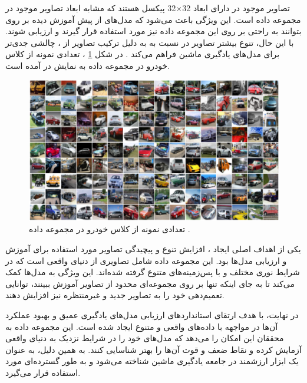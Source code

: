 تصاویر موجود در
دارای ابعاد
32$\times$32
پیکسل هستند که مشابه ابعاد تصاویر موجود در مجموعه داده
است. این ویژگی باعث می‌شود که مدل‌های از پیش آموزش دیده بر روی
بتوانند به راحتی بر روی این مجموعه داده نیز مورد استفاده قرار گیرند و ارزیابی شوند. با این حال، تنوع بیشتر تصاویر در
نسبت به
به دلیل ترکیب تصاویر از
،
چالشی جدی‌تر برای مدل‌های یادگیری ماشین فراهم می‌کند
\cite{darlow2018cinic}.
در شکل
\ref{cinic10}%
، تعدادی نمونه از کلاس خودرو در مجموعه داده
\mbox{}
به نمایش در آمده است.


\begin{figure}[t]
	\centering
	\includegraphics[scale=0.5]{images/chap5/cinic10.png}%
	\caption{%
		تعدادی نمونه از کلاس خودرو در مجموعه داده
		\cite{darlow2018cinic}.
	}
	\label{cinic10}
	\centering
\end{figure}



یکی از اهداف اصلی ایجاد
،
افزایش تنوع و پیچیدگی تصاویر مورد استفاده برای آموزش و ارزیابی مدل‌ها بود. این مجموعه داده شامل تصاویری از دنیای واقعی است که در شرایط نوری مختلف و با پس‌زمینه‌های متنوع گرفته شده‌اند. این ویژگی به مدل‌ها کمک می‌کند تا به جای اینکه تنها بر روی مجموعه‌ای محدود از تصاویر آموزش ببینند، توانایی تعمیم‌دهی خود را به تصاویر جدید و غیرمنتظره نیز افزایش دهند.

در نهایت،
با هدف ارتقای استانداردهای ارزیابی مدل‌های یادگیری عمیق و بهبود عملکرد آن‌ها در مواجهه با داده‌های واقعی و متنوع ایجاد شده است. این مجموعه داده به محققان این امکان را می‌دهد که مدل‌های خود را در شرایط نزدیک به دنیای واقعی آزمایش کرده و نقاط ضعف و قوت آن‌ها را بهتر شناسایی کنند. به همین دلیل،
به عنوان یک ابزار ارزشمند در جامعه یادگیری ماشین شناخته می‌شود و به طور گسترده‌ای مورد استفاده قرار می‌گیرد.


